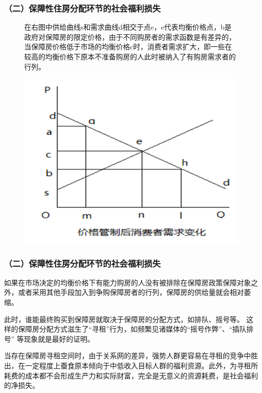\documentclass[aspectratio=169, 12pt]{beamer}
\begin{document}
\begin{frame}[plain]
    \frametitle{（二）保障性住房分配环节的社会福利损失}
    \begin{figure}
        \centering
        \begin{minipage}{0.4\linewidth}
            在右图中供给曲线s和需求曲线d相交于点e，e代表均衡价格点，b是政府对保障房的限定价格，由于不同购房者的需求函数是有差异的，当保障房价格低于市场的均衡价格c时，消费者需求扩大，即一些在较高的均衡价格下原本不准备购房的人此时被纳入了有购房需求者的行列。
        \end{minipage}%
        \begin{minipage}{0.6\linewidth}
            \centering
            \includegraphics[width=1.0\textwidth]{./resources/figure/regulation.png}
        \end{minipage}
        \end{figure}
\end{frame}

\begin{frame}[plain]
    \frametitle{（二）保障性住房分配环节的社会福利损失}
    如果在市场决定的均衡价格下有能力购房的人没有被排除在保障房政策保障对象之外，或者采用其他手段加入到争购保障房者的行列，保障房的供给量就会相对萎缩。
    \par
    此时，谁能最终购买到保障房就取决于保障房的分配方式，如排队、摇号等。
    这样的保障房分配方式滋生了“寻租”行为，如频繁见诸媒体的“摇号作弊”、“插队排号”
    等现象就是最好的证明。
    \par
    当存在保障房寻租空间时，由于关系网的差异，强势人群更容易在寻租的竞争中胜出，在一定程度上蚕食原本倾向于中低收入目标人群的福利资源。此外，为寻租所耗费的成本都不会形成生产力和实际财富，完全是无意义的资源耗费，是社会福利的净损失。
\end{frame}
\end{document}
